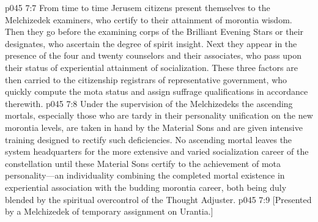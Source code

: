 \vs p045 7:7 From time to time Jerusem citizens present themselves to the Melchizedek examiners, who certify to their attainment of morontia wisdom. Then they go before the examining corps of the Brilliant Evening Stars or their designates, who ascertain the degree of spirit insight. Next they appear in the presence of the four and twenty counselors and their associates, who pass upon their status of experiential attainment of socialization. These three factors are then carried to the citizenship registrars of representative government, who quickly compute the mota status and assign suffrage qualifications in accordance therewith.
\pc \vs p045 7:8 Under the supervision of the Melchizedeks the ascending mortals, especially those who are tardy in their personality unification on the new morontia levels, are taken in hand by the Material Sons and are given intensive training designed to rectify such deficiencies. No ascending mortal leaves the system headquarters for the more extensive and varied socialization career of the constellation until these Material Sons certify to the achievement of mota personality---an individuality combining the completed mortal existence in experiential association with the budding morontia career, both being duly blended by the spiritual overcontrol of the Thought Adjuster.\plusone
\vsetoff
\vs p045 7:9 [Presented by a Melchizedek of temporary assignment on Urantia.]
